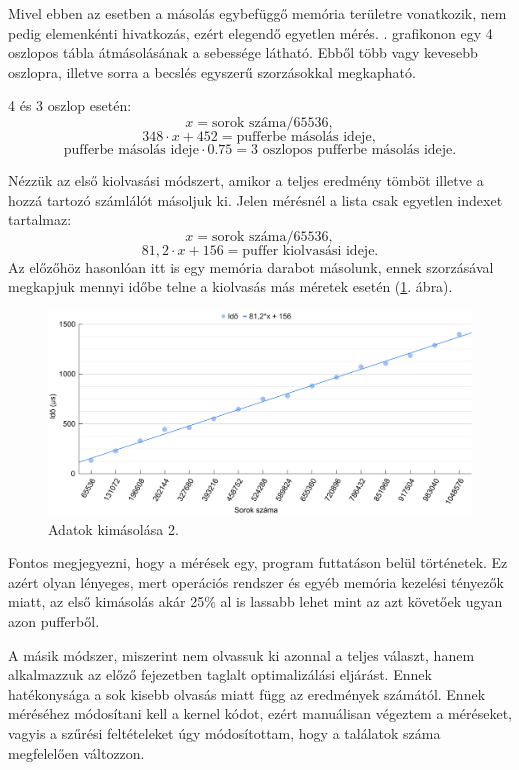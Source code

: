 Mivel ebben az esetben a másolás egybefüggő memória területre vonatkozik, nem pedig elemenkénti hivatkozás, ezért elegendő egyetlen mérés.
. grafikonon egy 4 oszlopos tábla átmásolásának a sebessége látható. Ebből több vagy kevesebb oszlopra, illetve sorra a becslés egyszerű szorzásokkal megkapható.

4 és 3 oszlop esetén:
$$ x = \text{sorok száma} / 65536, $$
$$ 348 \cdot x + 452 = \text{pufferbe másolás ideje}, $$ 
$$ \text{pufferbe másolás ideje} \cdot 0.75 = \text{3 oszlopos pufferbe másolás ideje}. $$


Nézzük az első kiolvasási módszert, amikor a teljes eredmény tömböt illetve a hozzá tartozó számlálót másoljuk ki.
Jelen mérésnél a lista csak egyetlen indexet tartalmaz:
$$ x = \text{sorok száma} / 65536, $$
$$ 81,2 \cdot x + 156 = \text{puffer kiolvasási ideje}. $$ 
Az előzőhöz hasonlóan itt is egy memória darabot másolunk, ennek szorzásával megkapjuk mennyi időbe telne a kiolvasás más méretek esetén (\ref{fig:pufferout}. ábra).

\begin{figure}[h!]
	\centering
	\includegraphics[width=14.8cm]{images/graph/pufferout.png}
	\caption{Adatok kimásolása 2.}
	\label{fig:pufferout}
\end{figure}

Fontos megjegyezni, hogy a mérések egy, program futtatáson belül történetek. Ez azért olyan lényeges, mert operációs rendszer és egyéb memória kezelési tényezők miatt, az első kimásolás akár 25\% al is lassabb lehet mint az azt követőek ugyan azon pufferből.

A másik módszer, miszerint nem olvassuk ki azonnal a teljes választ, hanem alkalmazzuk az előző fejezetben taglalt optimalizálási eljárást.
Ennek hatékonysága a sok kisebb olvasás miatt függ az eredmények számától. Ennek méréséhez módosítani kell a kernel kódot, ezért manuálisan végeztem a méréseket, vagyis a szűrési feltételeket úgy módosítottam, hogy a találatok száma megfelelően változzon.

